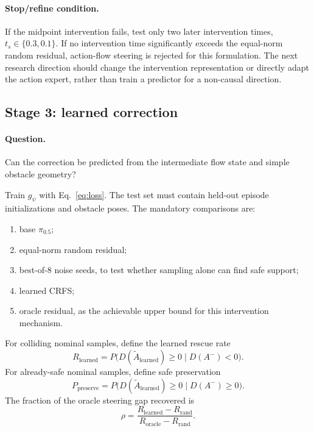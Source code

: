 \documentclass[10pt,conference]{IEEEtran}
\newcommand{\method}{\textsc{CRFS}}
\newcommand{\pizero}{\ensuremath{\pi_{0.5}}}
\newcommand{\1}{\mathbf{1}}
\begin{document}
\paragraph{Stop/refine condition.}
If the midpoint intervention fails, test only two later intervention times, $t_s\in\{0.3,0.1\}$. If no intervention time significantly exceeds the equal-norm random residual, action-flow steering is rejected for this formulation. The next research direction should change the intervention representation or directly adapt the action expert, rather than train a predictor for a non-causal direction.

\subsection{Stage 3: learned correction}

\paragraph{Question.} Can the correction be predicted from the intermediate flow state and simple obstacle geometry?

Train $g_\psi$ with Eq.~\eqref{eq:loss}. The test set must contain held-out episode initializations and obstacle poses. The mandatory comparisons are:
\begin{enumerate}[leftmargin=*,nosep]
    \item base \pizero{};
    \item equal-norm random residual;
    \item best-of-$8$ noise seeds, to test whether sampling alone can find safe support;
    \item learned \method{};
    \item oracle residual, as the achievable upper bound for this intervention mechanism.
\end{enumerate}

For colliding nominal samples, define the learned rescue rate
\begin{equation}
R_{\mathrm{learned}}
=P\big(D(\widetilde A_{\mathrm{learned}})\geq 0\mid D(A^-)<0\big).
\label{eq:rlearned}
\end{equation}
For already-safe nominal samples, define safe preservation
\begin{equation}
P_{\mathrm{preserve}}
=P\big(D(\widetilde A_{\mathrm{learned}})\geq 0\mid D(A^-)\geq 0\big).
\label{eq:preserve}
\end{equation}
The fraction of the oracle steering gap recovered is
\begin{equation}
\rho
=\frac{R_{\mathrm{learned}}-R_{\mathrm{rand}}}
{R_{\mathrm{oracle}}-R_{\mathrm{rand}}}.
\label{eq:rho}
\end{equation}
\end{document}
